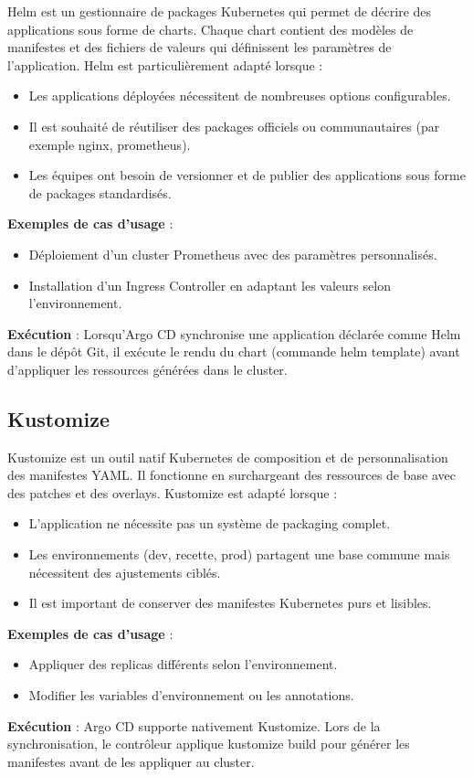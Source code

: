 Helm est un gestionnaire de packages Kubernetes qui permet de décrire des applications sous forme de charts. Chaque chart contient des modèles de manifestes et des fichiers de valeurs qui définissent les paramètres de l’application. Helm est particulièrement adapté lorsque :
\begin{itemize}
	\item Les applications déployées nécessitent de nombreuses options configurables.
	\item Il est souhaité de réutiliser des packages officiels ou communautaires (par exemple nginx, prometheus).
	\item Les équipes ont besoin de versionner et de publier des applications sous forme de packages standardisés.
\end{itemize}
\textbf{Exemples de cas d’usage} :
\begin{itemize}
	\item Déploiement d’un cluster Prometheus avec des paramètres personnalisés.
	\item Installation d’un Ingress Controller en adaptant les valeurs selon l’environnement.
\end{itemize}
\textbf{Exécution} : Lorsqu’Argo CD synchronise une application déclarée comme Helm dans le dépôt Git, il exécute le rendu du chart (commande helm template) avant d’appliquer les ressources générées dans le cluster.

\subsection{Kustomize}

Kustomize est un outil natif Kubernetes de composition et de personnalisation des manifestes YAML. Il fonctionne en surchargeant des ressources de base avec des patches et des overlays. Kustomize est adapté lorsque :
\begin{itemize}
	\item L’application ne nécessite pas un système de packaging complet.
	\item Les environnements (dev, recette, prod) partagent une base commune mais nécessitent des ajustements ciblés.
	\item Il est important de conserver des manifestes Kubernetes purs et lisibles.
\end{itemize}
\textbf{Exemples de cas d’usage} :
\begin{itemize}
	\item Appliquer des replicas différents selon l’environnement.
	\item Modifier les variables d’environnement ou les annotations.
\end{itemize}
\textbf{Exécution} : Argo CD supporte nativement Kustomize. Lors de la synchronisation, le contrôleur applique kustomize build pour générer les manifestes avant de les appliquer au cluster.

